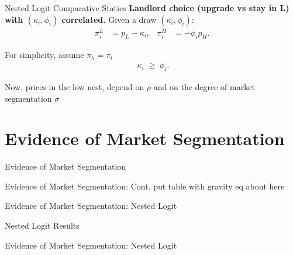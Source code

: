 \documentclass[10pt, xcolor=dvipsnames]{beamer}
\begin{document}
\begin{frame}{Nested Logit Comparative Statics}
    \textbf{Landlord choice (upgrade vs stay in L) with $(\kappa_i,\phi_i)$ correlated.}
Given a draw $(\kappa_i,\phi_i)$:
\begin{align*}
\pi_i^{L} &= p_L - \kappa_i, 
&
\pi_i^{H} &= -\phi_i p_H.
\end{align*}

For simplicity, assume $\pi_h = \pi_l$
\begin{align*}
\boxed{\;\kappa_i  \;\ge\; \phi_i }.
\end{align*}

Now, prices in the low nest, depend on $\rho$ and on the degree of market segmentation $\sigma$

\end{frame}

\section{Evidence of Market Segmentation}

\begin{frame}{Evidence of Market Segmentation}
    
\end{frame}

\begin{frame}{Evidence of Market Segmentation: Cont.}
    put table with gravity eq about here
\end{frame}

\begin{frame}{Evidence of Market Segmentation: Nested Logit}
    
\end{frame}

\begin{frame}{Nested Logit Results}
    
\end{frame}

\begin{frame}{Evidence of Market Segmentation: Nested Logit}
\end{frame}

    

    

    

    
    
\end{document}
